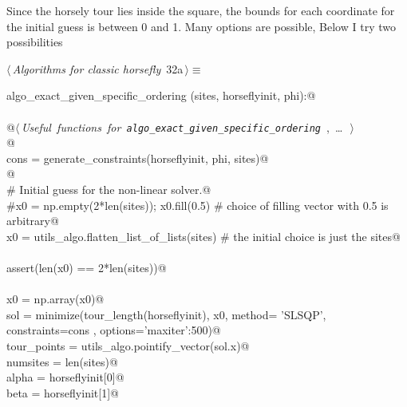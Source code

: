 \documentclass[11.5pt]{report}
\begin{document}
Since the horsely tour lies inside the square, the bounds for each coordinate for the initial guess is between 0 and 1. Many options 
are possible, Below I try two possibilities

\needspace{3cm}
\begin{flushleft} \small\label{scrap42}\raggedright\small
{} $\langle\,${\itshape Algorithms for classic horsefly}\nobreak\ {\footnotesize {32a}}$\,\rangle\equiv$
\vspace{-1ex}
\begin{list}{}{} \item
\mbox{}\verb@def algo_exact_given_specific_ordering (sites, horseflyinit, phi):@\\
\mbox{}\verb@@\\
\mbox{}\verb@    @\hbox{$\langle\,${\itshape Useful functions for \verb|algo_exact_given_specific_ordering|}\nobreak\ {\footnotesize {}, \ldots\ }$\,\rangle$}\verb@@\\
\mbox{}\verb@    @\\
\mbox{}\verb@    cons = generate_constraints(horseflyinit, phi, sites)@\\
\mbox{}\verb@    @\\
\mbox{}\verb@    # Initial guess for the non-linear solver.@\\
\mbox{}\verb@    #x0 = np.empty(2*len(sites)); x0.fill(0.5) # choice of filling vector with 0.5 is arbitrary@\\
\mbox{}\verb@    x0 = utils_algo.flatten_list_of_lists(sites) # the initial choice is just the sites@\\
\mbox{}\verb@@\\
\mbox{}\verb@    assert(len(x0) == 2*len(sites))@\\
\mbox{}\verb@@\\
\mbox{}\verb@    x0                  = np.array(x0)@\\
\mbox{}\verb@    sol                 = minimize(tour_length(horseflyinit), x0, method= 'SLSQP', \@\\
\mbox{}\verb@                                   constraints=cons         , options={'maxiter':500})@\\
\mbox{}\verb@    tour_points         = utils_algo.pointify_vector(sol.x)@\\
\mbox{}\verb@    numsites            = len(sites)@\\
\mbox{}\verb@    alpha               = horseflyinit[0]@\\
\mbox{}\verb@    beta                = horseflyinit[1]@\\

\end{list}
\end{flushleft}
\end{document}
